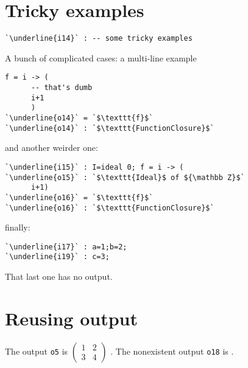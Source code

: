 \documentclass[12pt,a4paper]{amsart}
\begin{document}
\section{Tricky examples}
\begin{lstlisting}[language=Macaulay2]
`\underline{i14}` : -- some tricky examples\end{lstlisting}
A bunch of complicated cases: a multi-line example
\begin{lstlisting}[language=Macaulay2]
      f = i -> (
      -- that's dumb
      i+1
      )
`\underline{o14}` = `$\texttt{f}$`
`\underline{o14}` : `$\texttt{FunctionClosure}$`\end{lstlisting}
and another weirder one:
\begin{lstlisting}[language=Macaulay2]
`\underline{i15}` : I=ideal 0; f = i -> (
`\underline{o15}` : `$\texttt{Ideal}$ of ${\mathbb Z}$`
      i+1)
`\underline{o16}` = `$\texttt{f}$`
`\underline{o16}` : `$\texttt{FunctionClosure}$`\end{lstlisting}
finally:
\begin{lstlisting}[language=Macaulay2]
`\underline{i17}` : a=1;b=2;
`\underline{i19}` : c=3;\end{lstlisting}
That last one has no output.

\section{Reusing output}
The output {\tt o5} is $\left(\!\begin{array}{cc}
1&2\\
3&4
\end{array}\!\right)$%
.
The nonexistent output {\tt o18} is %
.
\end{document}
